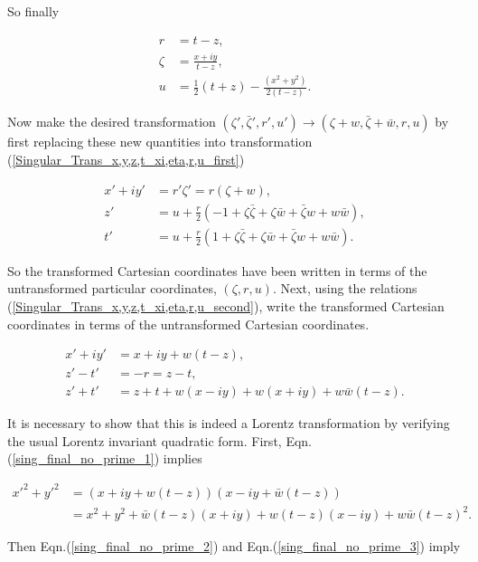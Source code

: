 \noindent So finally

\begin{align}\nonumber
r & = t - z, \\\nonumber
\zeta & = \frac{x + i y}{t-z}, \\\label{Singular_Trans_x,y,z,t_xi,eta,r,u_second}
u & = \frac{1}{2} (t + z) - \frac{(x^2 + y^2)}{2(t - z)}.
\end{align}

\noindent Now make the desired transformation $(\zeta', \bar{\zeta}', r', u') \rightarrow (\zeta + w, \bar{\zeta} + \bar{w}, r, u)$ by first replacing these new quantities into transformation (\ref{Singular_Trans_x,y,z,t_xi,eta,r,u_first})

\begin{align*}
x' + iy' & = r'\zeta' = r(\zeta + w), \\
z' & = u + \frac{r}{2}(-1 + \zeta \bar{\zeta} + \zeta \bar{w} + \bar{\zeta} w + w \bar{w}), \\
t' & = u + \frac{r}{2} (1 + \zeta \bar{\zeta} + \zeta \bar{w} + \bar{\zeta} w + w \bar{w}). 
\end{align*}

\noindent So the transformed Cartesian coordinates have been written in terms of the untransformed particular coordinates, $(\zeta, r, u)$. Next, using the relations (\ref{Singular_Trans_x,y,z,t_xi,eta,r,u_second}), write the transformed Cartesian coordinates in terms of the untransformed Cartesian coordinates.

\begin{align}
x' + i y' & = x + iy + w(t-z) \label{sing_final_no_prime_1}, \\
z' - t' & = -r = z - t \label{sing_final_no_prime_2}, \\
z' + t' & = z+t + w(x - i y) + w(x + iy) + w\bar{w} (t-z) \label{sing_final_no_prime_3}.
\end{align}

It is necessary to show that this is indeed a Lorentz transformation by verifying the usual Lorentz invariant quadratic form. First, Eqn.(\ref{sing_final_no_prime_1}) implies

\begin{align*}
{x'}^2 + {y'}^2 &  = (x + iy + w(t-z))(x - iy + \bar{w}(t-z)) \\
& = x^2 + y^2 + \bar{w}(t - z)(x+iy) + w(t-z)(x-iy) + w\bar{w}{(t-z)}^2.
\end{align*}

\noindent Then Eqn.(\ref{sing_final_no_prime_2}) and Eqn.(\ref{sing_final_no_prime_3}) imply

